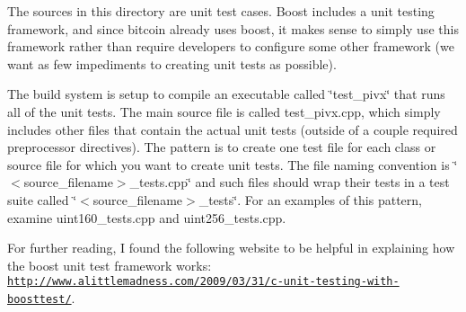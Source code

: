 The sources in this directory are unit test cases. Boost includes a unit testing framework, and since bitcoin already uses boost, it makes sense to simply use this framework rather than require developers to configure some other framework (we want as few impediments to creating unit tests as possible).

The build system is setup to compile an executable called \char`\"{}test\+\_\+pivx\char`\"{} that runs all of the unit tests. The main source file is called test\+\_\+pivx.\+cpp, which simply includes other files that contain the actual unit tests (outside of a couple required preprocessor directives). The pattern is to create one test file for each class or source file for which you want to create unit tests. The file naming convention is \char`\"{}$<$source\+\_\+filename$>$\+\_\+tests.\+cpp\char`\"{} and such files should wrap their tests in a test suite called \char`\"{}$<$source\+\_\+filename$>$\+\_\+tests\char`\"{}. For an examples of this pattern, examine uint160\+\_\+tests.\+cpp and uint256\+\_\+tests.\+cpp.

For further reading, I found the following website to be helpful in explaining how the boost unit test framework works\+: \href{http://www.alittlemadness.com/2009/03/31/c-unit-testing-with-boosttest/}{\tt http\+://www.\+alittlemadness.\+com/2009/03/31/c-\/unit-\/testing-\/with-\/boosttest/}. 